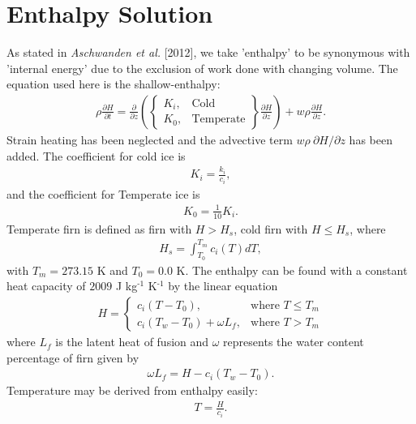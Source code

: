 \documentclass{article}%
\newcommand{\sups}[1]{\ensuremath{^{\textrm{#1}}}}
\begin{document}
\section{Enthalpy Solution}

As stated in \emph{Aschwanden et al.} [2012], we take 'enthalpy' to be synonymous with 'internal energy' due to the exclusion of work done with changing volume.  The equation used here is the shallow-enthalpy:
\begin{align*}
  \rho \frac{\partial H}{\partial t} = \frac{\partial}{\partial z} 
    \left( 
      \begin{Bmatrix}
        K_i, &\text{Cold}\\
        K_0, &\text{Temperate}
      \end{Bmatrix}
      \frac{\partial H}{\partial z} 
    \right) + w \rho \frac{\partial H}{\partial z}.
\end{align*}
Strain heating has been neglected and the advective term $w \rho\ \partial H / \partial z$ has been added.  The coefficient for cold ice is 
\begin{align*}
  K_i = \frac{k_i}{c_i},
\end{align*}
and the coefficient for Temperate ice is
\begin{align*}
  K_0 = \frac{1}{10}K_i.
\end{align*}
Temperate firn is defined as firn with $H > H_s$, cold firn with $H \leq H_s$, where
\begin{align*}
  H_s = \int_{T_0}^{T_m}{c_i(T)}dT,
\end{align*}
with $T_m = 273.15$ K and $T_0 = 0.0$ K.  The enthalpy can be found with a constant heat capacity of $2009$ J kg\sups{-1} K\sups{-1} by the linear equation
\begin{align*}
  H = 
  \begin{cases}
    c_i(T - T_0), &\text{where } T \leq T_m\\
    c_i(T_w - T_0) + \omega L_f,  &\text{where } T > T_m
  \end{cases}
\end{align*}
where $L_f$ is the latent heat of fusion and $\omega$ represents the water content percentage of firn given by
\begin{align*}
  \omega L_f = H - c_i(T_w - T_0).
\end{align*}
Temperature may be derived from enthalpy easily:
\begin{align*}
  T = \frac{H}{c_i}.
\end{align*}
\end{document}

